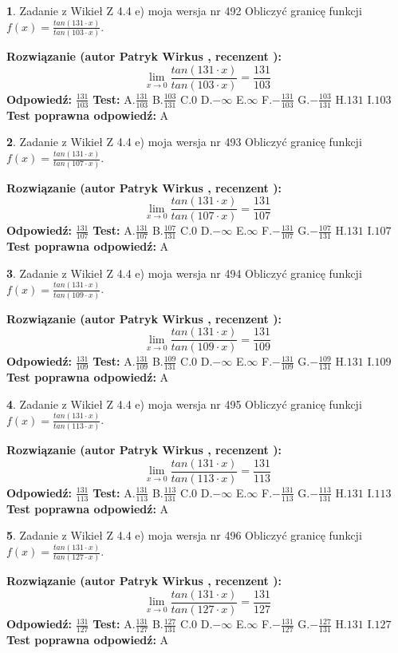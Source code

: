 \documentclass[12pt, a4paper]{article}
\theoremstyle{definition} %
\newtheorem{zad}{}
\newcommand{\zadStart}[1]{\begin{zad}#1\newline}
\newcommand{\zadStop}{\end{zad}}
\newcommand{\rozwStart}[2]{\noindent \textbf{Rozwiązanie (autor #1 , recenzent #2): }\newline}
\newcommand{\rozwStop}{\newline}
\newcommand{\odpStart}{\noindent \textbf{Odpowiedź:}\newline}
\newcommand{\odpStop}{\newline}
\newcommand{\testStart}{\noindent \textbf{Test:}\newline}
\newcommand{\testStop}{\newline}
\newcommand{\kluczStart}{\noindent \textbf{Test poprawna odpowiedź:}\newline}
\newcommand{\kluczStop}{\newline}
\begin{document}
\zadStart{Zadanie z Wikieł Z 4.4 e) moja wersja nr 492}
Obliczyć granicę funkcji $f(x)=\frac{tan(131\cdot x)}{tan(103\cdot x)}$.
\zadStop
\rozwStart{Patryk Wirkus}{}
$$\lim\limits_{x\to 0}\frac{tan(131\cdot x)}{tan(103\cdot x)}=
\frac{131}{103}$$
\rozwStop
\odpStart
$\frac{131}{103}$
\odpStop
\testStart
A.$\frac{131}{103}$
B.$\frac{103}{131}$
C.$0$
D.$-\infty$
E.$\infty$
F.$-\frac{131}{103}$
G.$-\frac{103}{131}$
H.$131$
I.$103$
\testStop
\kluczStart
A
\kluczStop



\zadStart{Zadanie z Wikieł Z 4.4 e) moja wersja nr 493}
Obliczyć granicę funkcji $f(x)=\frac{tan(131\cdot x)}{tan(107\cdot x)}$.
\zadStop
\rozwStart{Patryk Wirkus}{}
$$\lim\limits_{x\to 0}\frac{tan(131\cdot x)}{tan(107\cdot x)}=
\frac{131}{107}$$
\rozwStop
\odpStart
$\frac{131}{107}$
\odpStop
\testStart
A.$\frac{131}{107}$
B.$\frac{107}{131}$
C.$0$
D.$-\infty$
E.$\infty$
F.$-\frac{131}{107}$
G.$-\frac{107}{131}$
H.$131$
I.$107$
\testStop
\kluczStart
A
\kluczStop



\zadStart{Zadanie z Wikieł Z 4.4 e) moja wersja nr 494}
Obliczyć granicę funkcji $f(x)=\frac{tan(131\cdot x)}{tan(109\cdot x)}$.
\zadStop
\rozwStart{Patryk Wirkus}{}
$$\lim\limits_{x\to 0}\frac{tan(131\cdot x)}{tan(109\cdot x)}=
\frac{131}{109}$$
\rozwStop
\odpStart
$\frac{131}{109}$
\odpStop
\testStart
A.$\frac{131}{109}$
B.$\frac{109}{131}$
C.$0$
D.$-\infty$
E.$\infty$
F.$-\frac{131}{109}$
G.$-\frac{109}{131}$
H.$131$
I.$109$
\testStop
\kluczStart
A
\kluczStop



\zadStart{Zadanie z Wikieł Z 4.4 e) moja wersja nr 495}
Obliczyć granicę funkcji $f(x)=\frac{tan(131\cdot x)}{tan(113\cdot x)}$.
\zadStop
\rozwStart{Patryk Wirkus}{}
$$\lim\limits_{x\to 0}\frac{tan(131\cdot x)}{tan(113\cdot x)}=
\frac{131}{113}$$
\rozwStop
\odpStart
$\frac{131}{113}$
\odpStop
\testStart
A.$\frac{131}{113}$
B.$\frac{113}{131}$
C.$0$
D.$-\infty$
E.$\infty$
F.$-\frac{131}{113}$
G.$-\frac{113}{131}$
H.$131$
I.$113$
\testStop
\kluczStart
A
\kluczStop



\zadStart{Zadanie z Wikieł Z 4.4 e) moja wersja nr 496}
Obliczyć granicę funkcji $f(x)=\frac{tan(131\cdot x)}{tan(127\cdot x)}$.
\zadStop
\rozwStart{Patryk Wirkus}{}
$$\lim\limits_{x\to 0}\frac{tan(131\cdot x)}{tan(127\cdot x)}=
\frac{131}{127}$$
\rozwStop
\odpStart
$\frac{131}{127}$
\odpStop
\testStart
A.$\frac{131}{127}$
B.$\frac{127}{131}$
C.$0$
D.$-\infty$
E.$\infty$
F.$-\frac{131}{127}$
G.$-\frac{127}{131}$
H.$131$
I.$127$
\testStop
\kluczStart
A
\kluczStop
\end{document}
